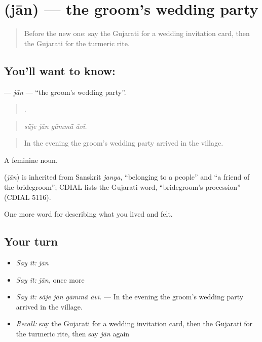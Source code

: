 \section[\texorpdfstring{\gu{જાન} (jān)}{જાન (jān)}]{ (jān) — the groom's wedding party}

\label{lesson:GU-C497-jan}



\begin{quote}
Before the new one: say the Gujarati for a wedding invitation card, then the Gujarati for the turmeric rite.
\end{quote}

\subsection*{You'll want to know: }
\textbf{} — \emph{jān} — \textquotedblleft{}the groom's wedding party\textquotedblright{}.

\begin{quote}
   .
\end{quote}

\begin{quote}
\emph{sā̃je jān gāmmā̃ āvī.}
\end{quote}

\begin{quote}
In the evening the groom's wedding party arrived in the village.
\end{quote}

A feminine noun.

\begin{cousinweb}
\textbf{} (\emph{jān}) is inherited from Sanskrit \emph{janya}, \textquotedblleft{}belonging to a people\textquotedblright{} and \textquotedblleft{}a friend of the bridegroom\textquotedblright{}; CDIAL lists the Gujarati word, \textquotedblleft{}bridegroom's procession\textquotedblright{} (CDIAL 5116).
\end{cousinweb}

\begin{grammarlens}[title={What you've built}]
One more word for describing what you lived and felt.
\end{grammarlens}

\subsection*{Your turn}
\begin{itemize}
\raggedright
  \item \emph{Say it:} \emph{jān}
  \item \emph{Say it:} \emph{jān}, once more
  \item \emph{Say it:} \emph{sā̃je jān gāmmā̃ āvī.} — In the evening the groom's wedding party arrived in the village.
  \item \emph{Recall:} say the Gujarati for a wedding invitation card, then the Gujarati for the turmeric rite, then say \emph{jān} again
\end{itemize}

